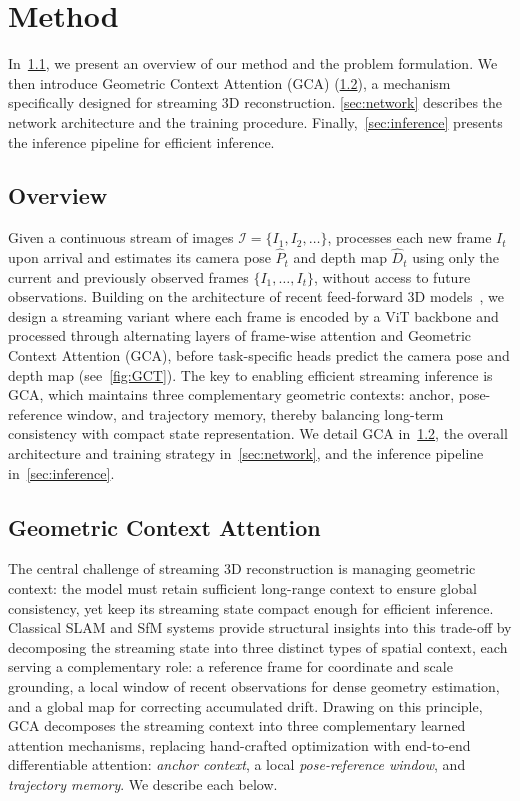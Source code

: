\section{Method}
\label{sec:method}

In~\cref{sec:overview}, we present an overview of our method and the problem formulation.
We then introduce Geometric Context Attention (GCA) (\cref{sec:attention}), a mechanism specifically designed for streaming 3D reconstruction. \cref{sec:network} describes the network architecture and the training procedure.
Finally,~\cref{sec:inference} presents the inference pipeline for efficient inference.

\subsection{Overview}
\label{sec:overview}
Given a continuous stream of images $\mathcal{I} = \{I_1, I_2, \ldots\}$, \method processes each new frame $I_t$ upon arrival and estimates its camera pose $\hat{P}_t$ and depth map $\hat{D}_t$ using only the current and previously observed frames $\{I_1, \ldots, I_t\}$, without access to future observations.
Building on the architecture of recent feed-forward 3D models~\cite{wang2025vggt}, we design a streaming variant where each frame is encoded by a ViT backbone and processed through alternating layers of frame-wise attention and Geometric Context Attention (GCA), before task-specific heads predict the camera pose and depth map (see~\cref{fig:GCT}).
The key to enabling efficient streaming inference is GCA, which maintains three complementary geometric contexts: anchor, pose-reference window, and trajectory memory, thereby balancing long-term consistency with compact state representation.
We detail GCA in~\cref{sec:attention}, the overall architecture and training strategy in~\cref{sec:network}, and the inference pipeline in~\cref{sec:inference}.



\subsection{Geometric Context Attention}
\label{sec:attention}
The central challenge of streaming 3D reconstruction is managing geometric context: the model must retain sufficient long-range context to ensure global consistency, yet keep its streaming state compact enough for efficient inference.
Classical SLAM and SfM systems provide structural insights into this trade-off by decomposing the streaming state into three distinct types of spatial context, each serving a complementary role: a reference frame for coordinate and scale grounding, a local window of recent observations for dense geometry estimation, and a global map for correcting accumulated drift.
Drawing on this principle, GCA decomposes the streaming context into three complementary learned attention mechanisms, replacing hand-crafted optimization with end-to-end differentiable attention: \emph{anchor context}, a local \emph{pose-reference window}, and \emph{trajectory memory}.
We describe each below.

